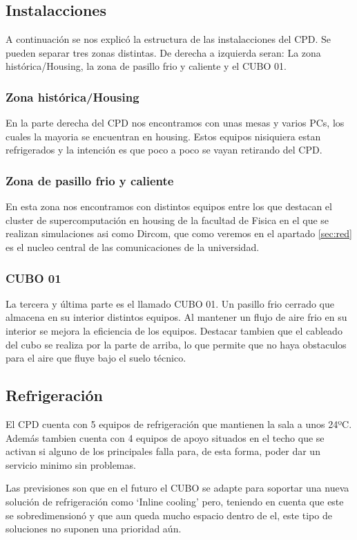 \documentclass[a4paper,11pt]{article}
\begin{document}
\subsection{Instalacciones}
A continuación se nos explicó la estructura de las instalacciones del CPD. Se pueden separar tres zonas distintas. De derecha a izquierda seran:  La zona histórica/Housing, la zona de pasillo frio y caliente y el CUBO 01.
\subsubsection{Zona histórica/Housing}
En la parte derecha del CPD nos encontramos con unas mesas y varios PCs, los cuales la mayoria se encuentran en housing. Estos equipos nisiquiera estan refrigerados y la intención es que poco a poco se vayan retirando del CPD.
\subsubsection{Zona de pasillo frio y caliente}
En esta zona nos encontramos con distintos equipos entre los que destacan el cluster de supercomputación en housing de la facultad de Fisica en el que se realizan simulaciones asi como Dircom, que como veremos en el apartado \ref{sec:red} es el nucleo central de las comunicaciones de la universidad.

\subsubsection{CUBO 01}
La tercera y última parte es el llamado CUBO 01. Un pasillo frio cerrado que almacena en su interior distintos equipos. Al mantener un flujo de aire frio en su interior se mejora la eficiencia de los equipos. Destacar tambien que el cableado del cubo se realiza por la parte de arriba, lo que permite que no haya obstaculos para el aire que fluye bajo el suelo técnico.

\subsection{Refrigeración}
El CPD cuenta con 5 equipos de refrigeración que mantienen la sala a unos 24ºC. Además tambien cuenta con 4 equipos de apoyo situados en el techo que se activan si alguno de los principales falla para, de esta forma, poder dar un servicio minimo sin problemas.

Las previsiones son que en el futuro el CUBO se adapte para soportar una nueva solución de refrigeración como `Inline cooling' pero, teniendo en cuenta que este se sobredimensionó y que aun queda mucho espacio dentro de el, este tipo de soluciones no suponen una prioridad aún.
\end{document}
